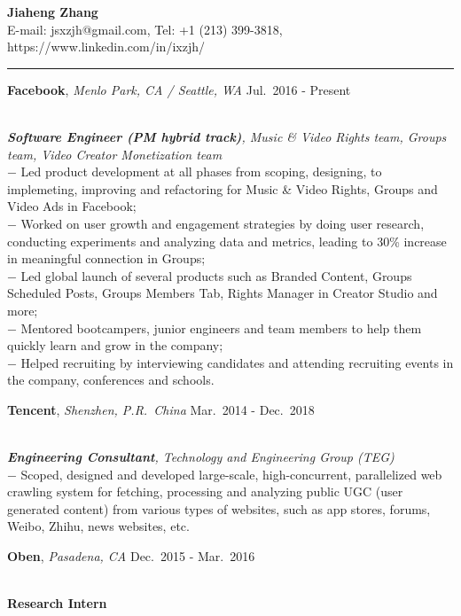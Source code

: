\documentclass[a4paper,10pt]{article}
\newcommand{\shadedsection}[1]{
    \setlength{\fboxsep}{0pt}
    \colorbox{shadecolor}{%
        \begin{minipage}{\linewidth}%
            \vspace{0.2em}%
            #1%
        \end{minipage}%
    }
}
\newenvironment{rSection}[1]{ %
  \medskip
  \hspace{-1.5em}{\color{Blue}\MakeUppercase{\large \bf {#1}}} %
  \vspace{-0.2em}
  \medskip
  \hrule %
  \begin{list}{}{ %
    \setlength{\leftmargin}{1.5em} %
  }
\setlength{\itemsep}{1pt}
  \item[]
}{
  \end{list}
}
\newcommand{\detail}[1]{{$-$ {#1}}}
\newcommand{\period}[3]{\normalsize {#1} \hfill {#2} - {#3}}
\begin{document}
\begin{center}
  {\huge \bf \color{Blue} Jiaheng Zhang}\\
  \medskip
  {E-mail: jsxzjh@gmail.com, Tel: +1 (213) 399-3818, https://www.linkedin.com/in/ixzjh/}
\end{center}

\begin{rSection}{Experience}
  \vspace{-1.5em}
  \item
    \shadedsection{\period{{\bf Facebook}, {\em Menlo Park, CA / Seattle, WA}}{Jul.~2016}{Present}}\\
    {\em {\bf Software Engineer (PM hybrid track)}, Music \& Video Rights team, Groups team, Video Creator Monetization team}\\
    \detail{Led product development at all phases from scoping, designing, to implemeting, improving and refactoring for Music \& Video Rights, Groups and Video Ads in Facebook;}\\
    \detail{Worked on user growth and engagement strategies by doing user research, conducting experiments and analyzing data and metrics, leading to 30\% increase in meaningful connection in Groups;}\\
    \detail{Led global launch of several products such as Branded Content, Groups Scheduled Posts, Groups Members Tab, Rights Manager in Creator Studio and more;}\\
    \detail{Mentored bootcampers, junior engineers and team members to help them quickly learn and grow in the company;}\\
    \detail{Helped recruiting by interviewing candidates and attending recruiting events in the company, conferences and schools.}
  \item
    \shadedsection{\period{{\bf Tencent}, {\em Shenzhen, P.R.~China}}{Mar.~2014}{Dec.~2018}}\\
    {\em {\bf Engineering Consultant}, Technology and Engineering Group (TEG)}\\
    \detail{Scoped, designed and developed large-scale, high-concurrent, parallelized web crawling system for fetching, processing and analyzing public UGC (user generated content) from various types of websites, such as app stores, forums, Weibo, Zhihu, news websites, etc.}
  \item
    \shadedsection{\period{{\bf Oben}, {\em Pasadena, CA}}{Dec.~2015}{Mar.~2016}}\\
    {\bf Research Intern}\\

\end{rSection}
\end{document}
